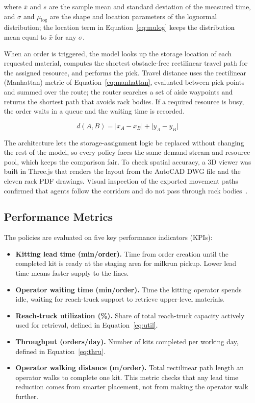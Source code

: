 \documentclass[12pt,a4paper]{article}
\begin{document}
\noindent where $\bar{x}$ and $s$ are the sample mean and standard deviation
of the measured time, and $\sigma$ and $\mu_{\log}$ are the shape and location
parameters of the lognormal distribution; the location term in
Equation~\eqref{eq:mulog} keeps the distribution mean equal to $\bar{x}$ for
any $\sigma$.

When an order is triggered, the model looks up the storage location of each
requested material, computes the shortest obstacle-free rectilinear travel
path for the assigned resource, and performs the pick. Travel distance uses
the rectilinear (Manhattan) metric of Equation~\eqref{eq:manhattan}, evaluated
between pick points and summed over the route; the router searches a set of
aisle waypoints and returns the shortest path that avoids rack bodies. If a
required resource is busy, the order waits in a queue and the waiting time is
recorded.

\begin{equation}
\label{eq:manhattan}
d(A,B) = \lvert x_A - x_B \rvert + \lvert y_A - y_B \rvert
\end{equation}

The architecture lets the storage-assignment logic be replaced without
changing the rest of the model, so every policy faces the same demand stream
and resource pool, which keeps the comparison fair. To check spatial accuracy,
a 3D viewer was built in Three.js that renders the layout from the AutoCAD DWG
file and the eleven rack PDF drawings. Visual inspection of the exported
movement paths confirmed that agents follow the corridors and do not pass
through rack bodies~\cite{ardiansyah2024,sargent2013}.

\subsection{Performance Metrics}
The policies are evaluated on five key performance indicators (KPIs):
\begin{itemize}
\item \textbf{Kitting lead time (min/order).} Time from order creation until
the completed kit is ready at the staging area for milkrun pickup. Lower lead
time means faster supply to the lines.
\item \textbf{Operator waiting time (min/order).} Time the kitting operator
spends idle, waiting for reach-truck support to retrieve upper-level
materials.
\item \textbf{Reach-truck utilization (\%).} Share of total reach-truck
capacity actively used for retrieval, defined in Equation~\eqref{eq:util}.
\item \textbf{Throughput (orders/day).} Number of kits completed per working
day, defined in Equation~\eqref{eq:thru}.
\item \textbf{Operator walking distance (m/order).} Total rectilinear path
length an operator walks to complete one kit. This metric checks that any lead
time reduction comes from smarter placement, not from making the operator walk
further.
\end{itemize}
\end{document}
